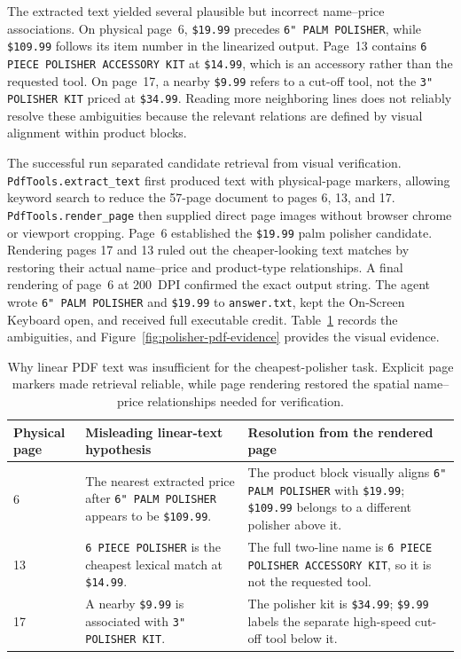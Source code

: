 \documentclass[11pt]{article}
\begin{document}
The extracted text yielded several plausible but incorrect name--price associations. On physical page~6, \texttt{\$19.99} precedes \texttt{6" PALM POLISHER}, while \texttt{\$109.99} follows its item number in the linearized output. Page~13 contains \texttt{6 PIECE POLISHER ACCESSORY KIT} at \texttt{\$14.99}, which is an accessory rather than the requested tool. On page~17, a nearby \texttt{\$9.99} refers to a cut-off tool, not the \texttt{3" POLISHER KIT} priced at \texttt{\$34.99}. Reading more neighboring lines does not reliably resolve these ambiguities because the relevant relations are defined by visual alignment within product blocks.

The successful run separated candidate retrieval from visual verification. \texttt{PdfTools.extract\_text} first produced text with physical-page markers, allowing keyword search to reduce the 57-page document to pages 6, 13, and 17. \texttt{PdfTools.render\_page} then supplied direct page images without browser chrome or viewport cropping. Page~6 established the \texttt{\$19.99} palm polisher candidate. Rendering pages 17 and 13 ruled out the cheaper-looking text matches by restoring their actual name--price and product-type relationships. A final rendering of page~6 at 200~DPI confirmed the exact output string. The agent wrote \texttt{6" PALM POLISHER} and \texttt{\$19.99} to \texttt{answer.txt}, kept the On-Screen Keyboard open, and received full executable credit. Table~\ref{tab:polisher-disambiguation} records the ambiguities, and Figure~\ref{fig:polisher-pdf-evidence} provides the visual evidence.

\begin{table}[t]
\centering
\small
\begin{tabularx}{\textwidth}{@{}p{}p{}X@{}}
\toprule
Physical page & Misleading linear-text hypothesis & Resolution from the rendered page \\
\midrule
6 & The nearest extracted price after \texttt{6" PALM POLISHER} appears to be \texttt{\$109.99}. & The product block visually aligns \texttt{6" PALM POLISHER} with \texttt{\$19.99}; \texttt{\$109.99} belongs to a different polisher above it. \\
13 & \texttt{6 PIECE POLISHER} is the cheapest lexical match at \texttt{\$14.99}. & The full two-line name is \texttt{6 PIECE POLISHER ACCESSORY KIT}, so it is not the requested tool. \\
17 & A nearby \texttt{\$9.99} is associated with \texttt{3" POLISHER KIT}. & The polisher kit is \texttt{\$34.99}; \texttt{\$9.99} labels the separate high-speed cut-off tool below it. \\
\bottomrule
\end{tabularx}
\caption{Why linear PDF text was insufficient for the cheapest-polisher task. Explicit page markers made retrieval reliable, while page rendering restored the spatial name--price relationships needed for verification.}
\label{tab:polisher-disambiguation}
\end{table}
\end{document}
